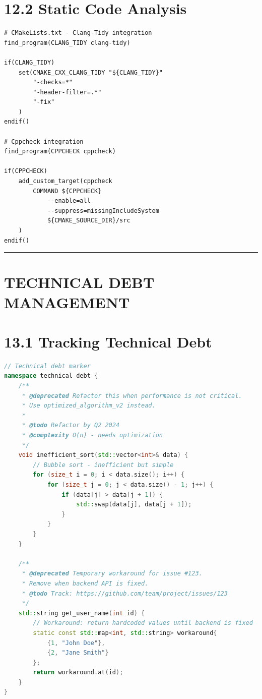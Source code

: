 \hypertarget{static-code-analysis}{%
\section{12.2 Static Code Analysis}\label{static-code-analysis}}

\begin{lstlisting}
# CMakeLists.txt - Clang-Tidy integration
find_program(CLANG_TIDY clang-tidy)

if(CLANG_TIDY)
    set(CMAKE_CXX_CLANG_TIDY "${CLANG_TIDY}"
        "-checks=*"
        "-header-filter=.*"
        "-fix"
    )
endif()

# Cppcheck integration
find_program(CPPCHECK cppcheck)

if(CPPCHECK)
    add_custom_target(cppcheck
        COMMAND ${CPPCHECK}
            --enable=all
            --suppress=missingIncludeSystem
            ${CMAKE_SOURCE_DIR}/src
    )
endif()
\end{lstlisting}

\begin{center}\rule{0.5\linewidth}{0.5pt}\end{center}

\hypertarget{technical-debt-management}{%
\section{TECHNICAL DEBT MANAGEMENT}\label{technical-debt-management}}

\hypertarget{tracking-technical-debt}{%
\section{13.1 Tracking Technical Debt}\label{tracking-technical-debt}}

\begin{lstlisting}[language={C++}]
// Technical debt marker
namespace technical_debt {
    /**
     * @deprecated Refactor this when performance is not critical.
     * Use optimized_algorithm_v2 instead.
     * 
     * @todo Refactor by Q2 2024
     * @complexity O(n) - needs optimization
     */
    void inefficient_sort(std::vector<int>& data) {
        // Bubble sort - inefficient but simple
        for (size_t i = 0; i < data.size(); i++) {
            for (size_t j = 0; j < data.size() - 1; j++) {
                if (data[j] > data[j + 1]) {
                    std::swap(data[j], data[j + 1]);
                }
            }
        }
    }
    
    /**
     * @deprecated Temporary workaround for issue #123.
     * Remove when backend API is fixed.
     * @todo Track: https://github.com/team/project/issues/123
     */
    std::string get_user_name(int id) {
        // Workaround: return hardcoded values until backend is fixed
        static const std::map<int, std::string> workaround{
            {1, "John Doe"},
            {2, "Jane Smith"}
        };
        return workaround.at(id);
    }
}
\end{lstlisting}

